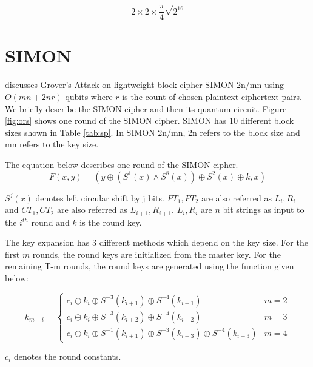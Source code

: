 \documentclass[preprint]{transcrypto}
\begin{document}
\begin{equation*}
    2\times 2\times \frac{\pi}{4}\sqrt{2^{16}}
\end{equation*}

\section{SIMON}\label{sec:simon}
\cite{gos} discusses Grover's Attack on lightweight block cipher SIMON 2n/mn using $O(mn + 2nr)$ qubits where $r$ is the count of chosen plaintext-ciphertext pairs. We briefly describe the SIMON cipher and then its quantum circuit. Figure \ref{fig:ors} shows one round of the SIMON cipher. SIMON has 10 different block sizes shown in Table \ref{tab:sp}. In SIMON 2n/mn, 2n refers to the block size and mn refers to the key size. 

The equation below describes one round of the SIMON cipher.
\begin{equation}\label{eq:simonfun}
    F(x,y) = (y\oplus (S^1(x)\wedge S^8(x)) \oplus S^2(x) \oplus k, x)
\end{equation}

$S^j(x)$ denotes left circular shift by j bits. $PT_1, PT_2$ are also referred as $L_i, R_i$ and $CT_1, CT_2$ are also referred as $L_{i+1}, R_{i+1}$. $L_i, R_i$ are $n$ bit strings as input to the $i^{th}$ round and $k$ is the round key.

The key expansion has 3 different methods which depend on the key size. For the first $m$ rounds, the round keys are initialized from the master key. For the remaining T-m rounds, the round keys are generated using the function given below:

\begin{equation}
 k_{m+i} = 
 \begin{cases} 
      c_i \oplus k_i \oplus S^{-3}(k_{i+1}) \oplus S^{-4}(k_{i+1}) &  m = 2 \\
      c_i \oplus k_i \oplus S^{-3}(k_{i+2}) \oplus S^{-4}(k_{i+2}) &  m = 3 \\
      c_i \oplus k_i \oplus S^{-1}(k_{i+1}) \oplus S^{-3}(k_{i+3}) \oplus S^{-4}(k_{i+3}) &  m = 4
  \end{cases}
\end{equation}

$c_i$ denotes the round constants.
\end{document}
